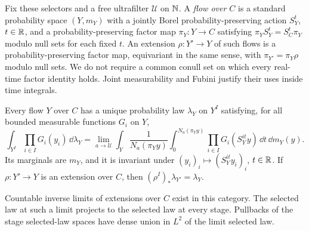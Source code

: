 Fix these selectors and a free ultrafilter $\mathcal U$ on $\mathbb N$.
A \emph{flow over $C$} is a standard probability space $(Y,m_Y)$
with a jointly Borel probability-preserving action $S_Y^t$, $t\in\mathbb R$,
and a probability-preserving factor map $\pi_Y:Y\to C$ satisfying
$\pi_Y S_Y^t=S_C^t\pi_Y$ modulo null sets for each fixed $t$.
An extension $\rho:Y'\to Y$ of such flows is a probability-preserving
factor map, equivariant in the same sense, with
$\pi_{Y'}=\pi_Y\rho$ modulo null sets.  We do not require a common
conull set on which every real-time factor identity holds.  Joint
measurability and Fubini justify their uses inside time integrals.

\begin{proposition}\label{prop:selected-law}
Every flow $Y$ over $C$ has a unique probability law $\lambda_Y$ on
$Y^I$ satisfying, for all bounded measurable functions $G_i$ on $Y$,
\begin{equation}\label{eq:selected-law}
 \int_{Y^I}\prod_{i\in I}G_i(y_i)\,\dd\lambda_Y
 =\lim_{a\to\mathcal U}\int_Y\frac1{N_a(\pi_Yy)}
   \int_0^{N_a(\pi_Yy)}\prod_{i\in I}G_i(S_Y^{it}y)
   \,\dd t\,\dd m_Y(y).
\end{equation}
Its marginals are $m_Y$, and it is invariant under
$(y_i)_i\mapsto(S_Y^{it}y_i)_i$, $t\in\mathbb R$.
If $\rho:Y'\to Y$ is an extension over $C$, then
$(\rho^I)_*\lambda_{Y'}=\lambda_Y$.

Countable inverse limits of extensions over $C$ exist in this
category.  The selected law at such a limit projects to the selected
law at every stage.  Pullbacks of the stage selected-law spaces have
dense union in $L^2$ of the limit selected law.
\end{proposition}

